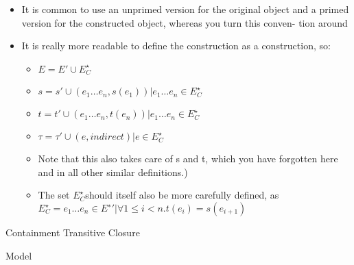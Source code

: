 \begin{itemize}
\item It is common to use an unprimed version for the original object and a
primed version for the constructed object, whereas you turn this conven-
tion around

\item It is really more readable to define the construction as a construction, so:
\begin{itemize}
\item  $E = E'\cup E^{\star}_{C}$
\item $s = s' \cup {(e_1 \dots e_n , s(e_1)) | e_1 \dots e_n \in E^{\star}_{C} }$
\item $t = t' \cup {(e_1 \dots e_n ,t(e_n )) | e_1 \dots e_n \in E^{\star}_{C} }$
\item $\tau = \tau' \cup {(e, indirect) | e \in E^{\star}_{C} }$
\end{itemize}
\begin{itemize}
\item Note that this also takes care of s and t, which you have forgotten here
and in all other similar definitions.)
\item The set $E^{\star}_{C}$should itself also be more carefully defined, as $E^{\star}_{C} = {e_1 \dots e_n \in E^∗' | \forall1 \leq i < n.t(e_i ) = s(e_{i+1} )}$
\end{itemize}
\end{itemize}


\begin{definition}{Containment Transitive Closure\\}
\label{def:instance_closure}

\end{definition}




\begin{definition}{Model\\}
\label{def:model}
\end{definition}



